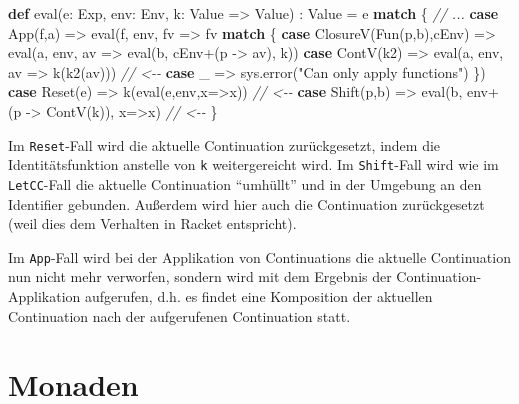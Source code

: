 \documentclass[]{article}
\newenvironment{Shaded}{}{}
\newcommand{\CommentTok}[1]{\textcolor[rgb]{0.38,0.63,0.69}{\textit{#1}}}
\newcommand{\FunctionTok}[1]{\textcolor[rgb]{0.02,0.16,0.49}{#1}}
\newcommand{\KeywordTok}[1]{\textcolor[rgb]{0.00,0.44,0.13}{\textbf{#1}}}
\newcommand{\NormalTok}[1]{#1}
\newcommand{\StringTok}[1]{\textcolor[rgb]{0.25,0.44,0.63}{#1}}
\begin{document}
\begin{Shaded}
\begin{Highlighting}[]
\KeywordTok{def} \FunctionTok{eval}\NormalTok{(e: Exp, env: Env, k: Value =\textgreater{} Value) : Value = e }\KeywordTok{match}\NormalTok{ \{}
  \CommentTok{// ...}
  \KeywordTok{case} \FunctionTok{App}\NormalTok{(f,a) =\textgreater{} }\FunctionTok{eval}\NormalTok{(f, env, fv =\textgreater{} fv }\KeywordTok{match}\NormalTok{ \{}
    \KeywordTok{case} \FunctionTok{ClosureV}\NormalTok{(}\FunctionTok{Fun}\NormalTok{(p,b),cEnv) =\textgreater{}}
      \FunctionTok{eval}\NormalTok{(a, env, av =\textgreater{} }\FunctionTok{eval}\NormalTok{(b, cEnv+(p {-}\textgreater{} av), k))}
    \KeywordTok{case} \FunctionTok{ContV}\NormalTok{(k2) =\textgreater{} }\FunctionTok{eval}\NormalTok{(a, env, av =\textgreater{} }\FunctionTok{k}\NormalTok{(}\FunctionTok{k2}\NormalTok{(av))) }\CommentTok{// \textless{}{-}{-}}
    \KeywordTok{case}\NormalTok{ \_ =\textgreater{} sys.}\FunctionTok{error}\NormalTok{(}\StringTok{"Can only apply functions"}\NormalTok{)}
\NormalTok{  \})}
  \KeywordTok{case} \FunctionTok{Reset}\NormalTok{(e) =\textgreater{} }\FunctionTok{k}\NormalTok{(}\FunctionTok{eval}\NormalTok{(e,env,x=\textgreater{}x)) }\CommentTok{// \textless{}{-}{-}}
  \KeywordTok{case} \FunctionTok{Shift}\NormalTok{(p,b) =\textgreater{} }\FunctionTok{eval}\NormalTok{(b, env+(p {-}\textgreater{} }\FunctionTok{ContV}\NormalTok{(k)), x=\textgreater{}x) }\CommentTok{// \textless{}{-}{-}}
\NormalTok{\}}
\end{Highlighting}
\end{Shaded}

Im \texttt{Reset}-Fall wird die aktuelle Continuation zurückgesetzt,
indem die Identitätsfunktion anstelle von \texttt{k} weitergereicht
wird. Im \texttt{Shift}-Fall wird wie im \texttt{LetCC}-Fall die
aktuelle Continuation ``umhüllt'' und in der Umgebung an den Identifier
gebunden. Außerdem wird hier auch die Continuation zurückgesetzt (weil
dies dem Verhalten in Racket entspricht).

Im \texttt{App}-Fall wird bei der Applikation von Continuations die
aktuelle Continuation nun nicht mehr verworfen, sondern wird mit dem
Ergebnis der Continuation-Applikation aufgerufen, d.h. es findet eine
Komposition der aktuellen Continuation nach der aufgerufenen
Continuation statt.

\hypertarget{monaden}{%
\section{Monaden}\label{monaden}}
\end{document}

